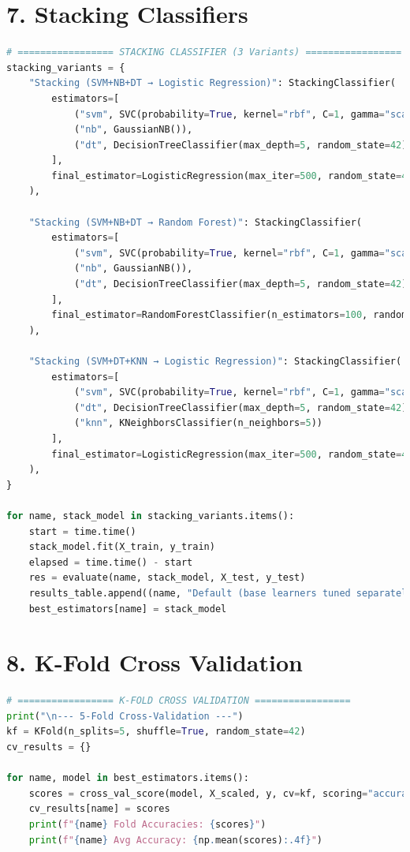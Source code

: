 \documentclass[12pt]{article}
\begin{document}
\section*{7. Stacking Classifiers}
\begin{lstlisting}[language=Python]
# ================= STACKING CLASSIFIER (3 Variants) =================
stacking_variants = {
    "Stacking (SVM+NB+DT → Logistic Regression)": StackingClassifier(
        estimators=[
            ("svm", SVC(probability=True, kernel="rbf", C=1, gamma="scale")),
            ("nb", GaussianNB()),
            ("dt", DecisionTreeClassifier(max_depth=5, random_state=42))
        ],
        final_estimator=LogisticRegression(max_iter=500, random_state=42)
    ),

    "Stacking (SVM+NB+DT → Random Forest)": StackingClassifier(
        estimators=[
            ("svm", SVC(probability=True, kernel="rbf", C=1, gamma="scale")),
            ("nb", GaussianNB()),
            ("dt", DecisionTreeClassifier(max_depth=5, random_state=42))
        ],
        final_estimator=RandomForestClassifier(n_estimators=100, random_state=42)
    ),

    "Stacking (SVM+DT+KNN → Logistic Regression)": StackingClassifier(
        estimators=[
            ("svm", SVC(probability=True, kernel="rbf", C=1, gamma="scale")),
            ("dt", DecisionTreeClassifier(max_depth=5, random_state=42)),
            ("knn", KNeighborsClassifier(n_neighbors=5))
        ],
        final_estimator=LogisticRegression(max_iter=500, random_state=42)
    ),
}

for name, stack_model in stacking_variants.items():
    start = time.time()
    stack_model.fit(X_train, y_train)
    elapsed = time.time() - start
    res = evaluate(name, stack_model, X_test, y_test)
    results_table.append((name, "Default (base learners tuned separately)", *res, elapsed))
    best_estimators[name] = stack_model
\end{lstlisting}

\section*{8. K-Fold Cross Validation}
\begin{lstlisting}[language=Python]
# ================= K-FOLD CROSS VALIDATION =================
print("\n--- 5-Fold Cross-Validation ---")
kf = KFold(n_splits=5, shuffle=True, random_state=42)
cv_results = {}

for name, model in best_estimators.items():
    scores = cross_val_score(model, X_scaled, y, cv=kf, scoring="accuracy")
    cv_results[name] = scores
    print(f"{name} Fold Accuracies: {scores}")
    print(f"{name} Avg Accuracy: {np.mean(scores):.4f}")
\end{lstlisting}
\end{document}
